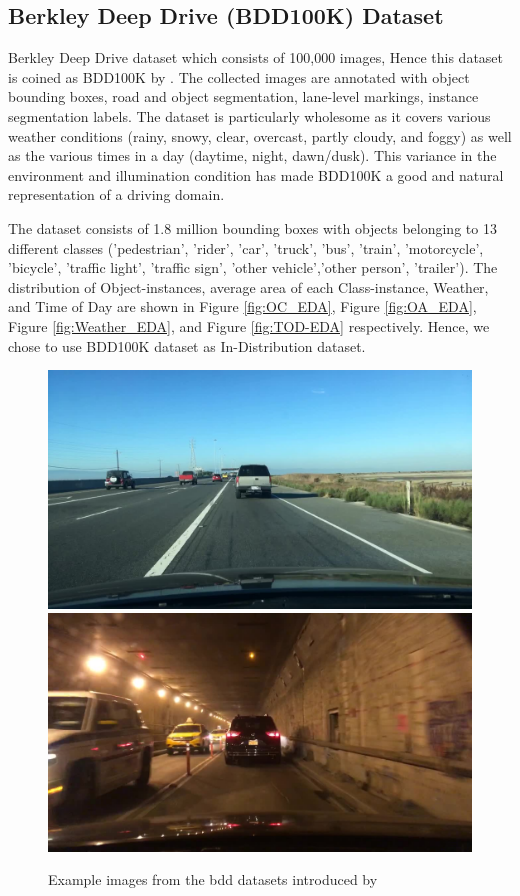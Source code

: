     \subsection{Berkley Deep Drive (BDD100K) Dataset}
    \label{BDD100K_about}
    Berkley Deep Drive dataset which consists of 100,000 images, Hence this dataset is coined as BDD100K by \citet{bdd100k}. The collected images are annotated with object bounding boxes, road and object segmentation, lane-level markings, instance segmentation labels. The dataset is particularly wholesome as it covers various weather conditions (rainy, snowy, clear, overcast, partly cloudy, and foggy) as well as the various times in a day (daytime, night, dawn/dusk). This variance in the environment and illumination condition has made BDD100K a good and natural representation of a driving domain.
    
    The dataset consists of 1.8 million bounding boxes with objects belonging to 13 different classes ('pedestrian', 'rider', 'car', 'truck', 'bus', 'train', 'motorcycle', 'bicycle', 'traffic light', 'traffic sign', 'other vehicle','other person', 'trailer'). The distribution of Object-instances, average area of each Class-instance, Weather, and Time of Day are shown in Figure \ref{fig:OC_EDA}, Figure \ref{fig:OA_EDA}, Figure \ref{fig:Weather_EDA}, and Figure \ref{fig:TOD-EDA} respectively. Hence, we chose to use BDD100K dataset as In-Distribution dataset. 
    
    \begin{figure}[H]
        \includegraphics[width=.475\textwidth]{images/dataset_images/bdd01.jpg}
        \includegraphics[width=.475\textwidth]{images/dataset_images/bdd05.jpg}
        \caption[Sample images from \acrshort{bdd} dataset]{Example images from the \acrshort{bdd} datasets introduced by \citet{bdd100k}}
        \label{fig:bdd100k_samples}
    \end{figure}
    

